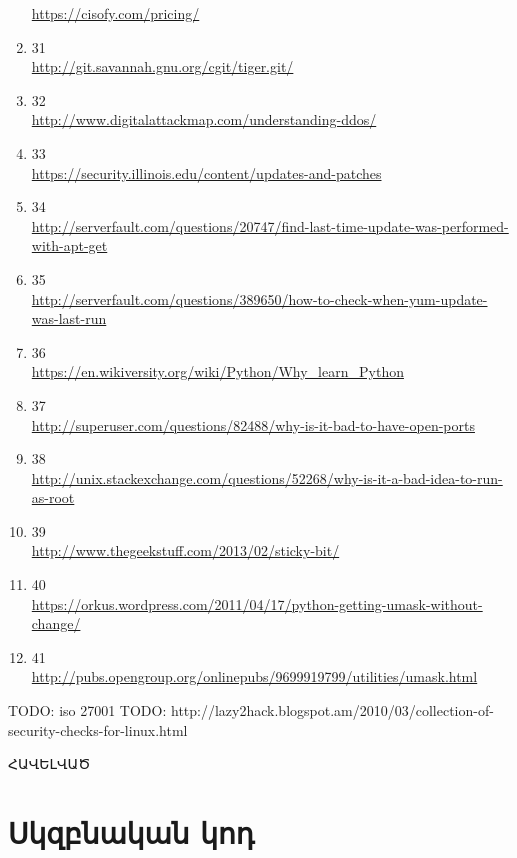 \documentclass[a4paper,12pt]{article}
\begin{document}
\begin{sloppypar}
\begin{enumerate}
	\url{https://cisofy.com/pricing/}
\item 31 \\
	\url{http://git.savannah.gnu.org/cgit/tiger.git/}
\item 32 \\
	\url{http://www.digitalattackmap.com/understanding-ddos/}
\item 33 \\
	\url{https://security.illinois.edu/content/updates-and-patches}
\item 34 \\
	\url{http://serverfault.com/questions/20747/find-last-time-update-was-performed-with-apt-get}
\item 35 \\
	\url{http://serverfault.com/questions/389650/how-to-check-when-yum-update-was-last-run}
\item 36 \\
	\url{https://en.wikiversity.org/wiki/Python/Why\_learn\_Python}
\item 37 \\
	\url{http://superuser.com/questions/82488/why-is-it-bad-to-have-open-ports}
\item 38 \\
	\url{http://unix.stackexchange.com/questions/52268/why-is-it-a-bad-idea-to-run-as-root}
\item 39 \\
	\url{http://www.thegeekstuff.com/2013/02/sticky-bit/}
\item 40 \\
	\url{https://orkus.wordpress.com/2011/04/17/python-getting-umask-without-change/}
\item 41 \\
	\url{http://pubs.opengroup.org/onlinepubs/9699919799/utilities/umask.html}
\end{enumerate}


TODO: iso 27001
TODO: http://lazy2hack.blogspot.am/2010/03/collection-of-security-checks-for-linux.html




\newpage
\vspace*{\fill}
\begingroup
\centering
\centerline{\Huge{ՀԱՎԵԼՎԱԾ}}
\endgroup
\vspace*{\fill}
\newpage


\section*{Սկզբնական կոդ}







\end{sloppypar}
\end{document}
